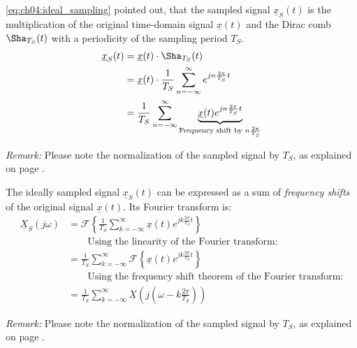 \begin{refsection}
\eqref{eq:ch04:ideal_sampling} pointed out, that the sampled signal $\underline{x}_S(t)$ is the multiplication of the original time-domain signal $\underline{x}(t)$ and the Dirac comb $\Sha_{T_S}(t)$ with a periodicity of the sampling period $T_S$.
\begin{equation}
	\begin{split}
		\underline{x}_S(t) &= \underline{x}(t) \cdot \Sha_{T_S}(t) \\
		 &= \underline{x}(t) \cdot \frac{1}{T_S} \sum\limits_{n = -\infty}^{\infty} e^{j n \frac{2 \pi}{T_S} t} \\
		 &= \frac{1}{T_S} \sum\limits_{n = -\infty}^{\infty} \underbrace{\underline{x}(t) e^{j n \frac{2 \pi}{T_S} t}}_{\text{Frequency shift by } n \frac{2 \pi}{T_S}} \\
	\end{split}
\end{equation}

\textit{Remark:} Please note the normalization of the sampled signal by $T_S$, as explained on page \pageref{ref:ch04:normalization_xs}.

The ideally sampled signal $\underline{x}_S(t)$ can be expressed as a sum of \emph{frequency shifts} of the original signal $\underline{x}(t)$. Its Fourier transform is:
\begin{equation}
	\begin{split}
		\underline{X}_S\left(j \omega\right) &= \mathcal{F}\left\{\frac{1}{T_S} \sum\limits_{k = -\infty}^{\infty} \underline{x}(t) e^{j k \frac{2 \pi}{T_S} t}\right\} \\
		 & \qquad \text{Using the linearity of the Fourier transform:} \\
		 &= \frac{1}{T_S} \sum\limits_{k = -\infty}^{\infty} \mathcal{F}\left\{\underline{x}(t) e^{j k \frac{2 \pi}{T_S} t}\right\} \\
		 & \qquad \text{Using the frequency shift theorem of the Fourier transform:} \\
		 &= \frac{1}{T_S} \sum\limits_{k = -\infty}^{\infty} \underline{X}\left(j \left(\omega - k \frac{2 \pi}{T_S} \right)\right)
	\end{split}
\end{equation}

\textit{Remark:} Please note the normalization of the sampled signal by $T_S$, as explained on page \pageref{ref:ch04:normalization_xs}.


\end{refsection}
